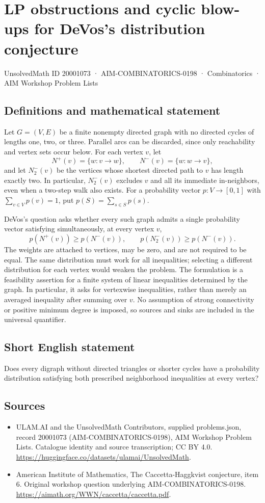 \documentclass[11pt,a4paper]{article}
\begin{document}
\section*{LP obstructions and cyclic blow-ups for DeVos's distribution conjecture}\label{20001073}
{\small UnsolvedMath ID 20001073 · AIM-COMBINATORICS-0198 · Combinatorics · AIM Workshop Problem Lists}
\subsection{Definitions and mathematical statement}
Let $G=(V,E)$ be a finite nonempty directed graph with no directed cycles of lengths one, two, or three.
Parallel arcs can be discarded, since only reachability and vertex sets occur below.
For each vertex $v$, let
\[
 N^+(v)=\{w:v\to w\},\qquad N^-(v)=\{w:w\to v\},
\]
and let $N^-_2(v)$ be the vertices whose shortest directed path to $v$ has length exactly two.
In particular, $N^-_2(v)$ excludes $v$ and all its immediate in-neighbors, even when a two-step walk also exists.
For a probability vector $p:V\to[0,1]$ with $\sum_{v\in V}p(v)=1$, put $p(S)=\sum_{s\in S}p(s)$.

DeVos's question asks whether every such graph admits a single probability vector satisfying simultaneously, at every vertex $v$,
\[
 p(N^+(v))\geq p(N^-(v)),\qquad
 p(N^-_2(v))\geq p(N^-(v)).
\]
The weights are attached to vertices, may be zero, and are not required to be equal.
The same distribution must work for all inequalities; selecting a different distribution for each vertex would weaken the problem.
The formulation is a feasibility assertion for a finite system of linear inequalities determined by the graph.
In particular, it asks for vertexwise inequalities, rather than merely an averaged inequality after summing over $v$.
No assumption of strong connectivity or positive minimum degree is imposed, so sources and sinks are included in the universal quantifier.
\subsection{Short English statement}
Does every digraph without directed triangles or shorter cycles have a probability distribution satisfying both prescribed neighborhood inequalities at every vertex?
\subsection{Sources}
\begin{itemize}
\item[S1] ULAM.AI and the UnsolvedMath Contributors, supplied problems.json, record 20001073 (AIM-COMBINATORICS-0198), AIM Workshop Problem Lists. Catalogue identity and source transcription; CC BY 4.0.
\url{https://huggingface.co/datasets/ulamai/UnsolvedMath}.
\item[S2] American Institute of Mathematics, The Caccetta-Haggkvist conjecture, item 6. Original workshop question underlying AIM-COMBINATORICS-0198.
\url{https://aimath.org/WWN/caccetta/caccetta.pdf}.
\end{itemize}
\end{document}
